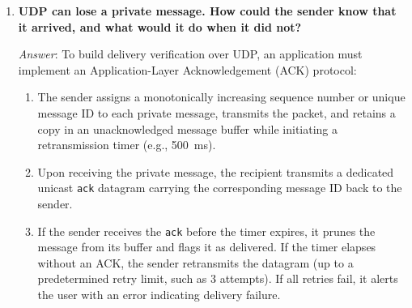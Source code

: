 \documentclass[11pt,a4paper]{article}
\begin{document}
\begin{enumerate}[label=\textbf{Q\arabic*.}, leftmargin=*]
    \textit{Answer}: If the peer departed gracefully via \texttt{/quit}, it broadcasted a \texttt{leave} datagram, causing other peers to prune it immediately from their roster; attempting to send to it will instantly yield \texttt{* <name> is not online}. However, if the peer disconnected abruptly (crash or network pull) one second ago, it remains in the local routing table until the 15-second timeout expires. The sender will transmit the UDP datagram to the former ephemeral endpoint. At the destination machine:
    \begin{itemize}[noitemsep]
        \item The operating system finds no socket bound to that ephemeral port and automatically generates an \textbf{ICMP Port Unreachable} message back to the sender.
        \item In standard UDP socket programming, this ICMP packet is either silently discarded by the sender's network stack or surfaces asynchronously on the next socket call. The private message is simply lost, mirroring UDP's fundamental best-effort semantics.
    \end{itemize}

    \item \textbf{UDP can lose a private message. How could the sender know that it arrived, and what would it do when it did not?}
    
    \textit{Answer}: To build delivery verification over UDP, an application must implement an Application-Layer Acknowledgement (ACK) protocol:
    \begin{enumerate}[noitemsep]
        \item The sender assigns a monotonically increasing sequence number or unique message ID to each private message, transmits the packet, and retains a copy in an unacknowledged message buffer while initiating a retransmission timer (e.g., 500~ms).
        \item Upon receiving the private message, the recipient transmits a dedicated unicast \texttt{ack} datagram carrying the corresponding message ID back to the sender.
        \item If the sender receives the \texttt{ack} before the timer expires, it prunes the message from its buffer and flags it as delivered. If the timer elapses without an ACK, the sender retransmits the datagram (up to a predetermined retry limit, such as 3 attempts). If all retries fail, it alerts the user with an error indicating delivery failure.
    \end{enumerate}
\end{enumerate}
\end{document}
